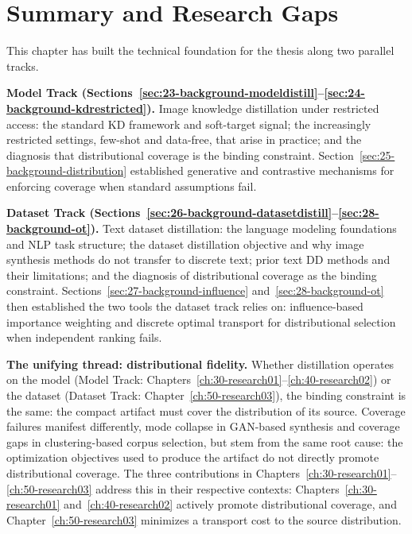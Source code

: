 \section{Summary and Research Gaps} \label{sec:29-background-summary}
\begin{foldable}
  This chapter has built the technical foundation for the thesis along two parallel tracks.
\end{foldable}

\begin{foldable}
  \textbf{Model Track (Sections~\ref{sec:23-background-modeldistill}--\ref{sec:24-background-kdrestricted}).}
  Image knowledge distillation under restricted access: the standard \ac{KD} framework and soft-target signal; the increasingly restricted settings, few-shot and data-free, that arise in practice; and the diagnosis that distributional coverage is the binding constraint.
  Section~\ref{sec:25-background-distribution} established generative and contrastive mechanisms for enforcing coverage when standard assumptions fail.
\end{foldable}

\begin{foldable}
  \textbf{Dataset Track (Sections~\ref{sec:26-background-datasetdistill}--\ref{sec:28-background-ot}).}
  Text dataset distillation: the language modeling foundations and \acl{NLP} task structure; the dataset distillation objective and why image synthesis methods do not transfer to discrete text; prior text \ac{DD} methods and their limitations; and the diagnosis of distributional coverage as the binding constraint.
  Sections~\ref{sec:27-background-influence} and~\ref{sec:28-background-ot} then established the two tools the dataset track relies on: influence-based importance weighting and discrete optimal transport for distributional selection when independent ranking fails.
\end{foldable}

\begin{foldable}
  \textbf{The unifying thread: distributional fidelity.}
  Whether distillation operates on the model (Model Track: Chapters~\ref{ch:30-research01}--\ref{ch:40-research02}) or the dataset (Dataset Track: Chapter~\ref{ch:50-research03}), the binding constraint is the same: the compact artifact must cover the distribution of its source.
  Coverage failures manifest differently, mode collapse in GAN-based synthesis and coverage gaps in clustering-based corpus selection, but stem from the same root cause: the optimization objectives used to produce the artifact do not directly promote distributional coverage.
  The three contributions in Chapters~\ref{ch:30-research01}--\ref{ch:50-research03} address this in their respective contexts: Chapters~\ref{ch:30-research01} and~\ref{ch:40-research02} actively promote distributional coverage, and Chapter~\ref{ch:50-research03} minimizes a transport cost to the source distribution.
\end{foldable}


